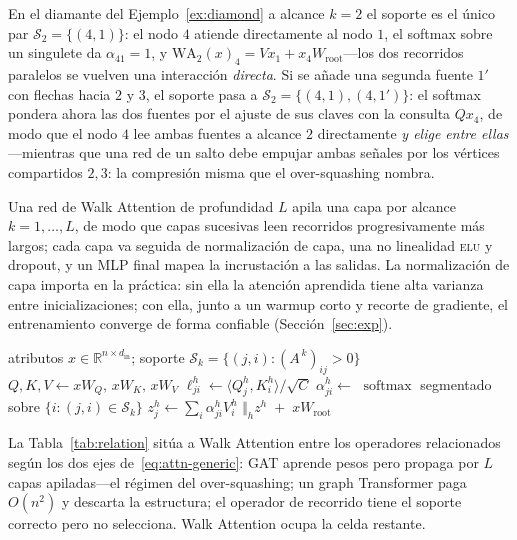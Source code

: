 \documentclass[runningheads]{llncs}
\newcommand{\RR}{\mathbb{R}}
\newcommand{\Adj}{A}
\DeclareMathOperator{\softmax}{softmax}
\begin{document}
\begin{example}\label{ex:layer}
En el diamante del Ejemplo~\ref{ex:diamond} a alcance $k=2$ el soporte es el
único par $\mathcal{S}_2=\{(4,1)\}$: el nodo $4$ atiende directamente al nodo
$1$, el softmax sobre un singulete da $\alpha_{41}=1$, y
$\mathrm{WA}_2(x)_4=Vx_1+x_4W_{\!\text{root}}$---los dos recorridos paralelos
se vuelven una interacción \emph{directa}. Si se añade una segunda fuente $1'$
con flechas hacia $2$ y $3$, el soporte pasa a
$\mathcal{S}_2=\{(4,1),(4,1')\}$: el softmax pondera ahora las dos fuentes por
el ajuste de sus claves con la consulta $Qx_4$, de modo que el nodo $4$ lee
ambas fuentes a alcance $2$ directamente \emph{y elige entre ellas}---mientras
que una red de un salto debe empujar ambas señales por los vértices compartidos
$2,3$: la compresión misma que el over-squashing nombra.
\end{example}

Una red de Walk Attention de profundidad $L$ apila una capa por alcance
$k=1,\dots,L$, de modo que capas sucesivas leen recorridos progresivamente más
largos; cada capa va seguida de normalización de capa, una no linealidad
\textsc{elu} y dropout, y un MLP final mapea la incrustación a las salidas. La
normalización de capa importa en la práctica: sin ella la atención aprendida
tiene alta varianza entre inicializaciones; con ella, junto a un warmup corto y
recorte de gradiente, el entrenamiento converge de forma confiable
(Sección~\ref{sec:exp}).

\begin{algorithm}[t]
\caption{Capa de Walk Attention a alcance $k$ (dispersa).}\label{alg:wa}
\begin{algorithmic}[1]
\Require atributos $x\in\RR^{n\times d_{\text{in}}}$; soporte
  $\mathcal{S}_k=\{(j,i):(\Adj^{\,k})_{ij}>0\}$
\State $Q,K,V \gets xW_Q,\,xW_K,\,xW_V$ 
  \State $\ell^h_{ji}\gets \langle Q^h_j,K^h_i\rangle/\sqrt{C}$
\EndFor
\State $\alpha^h_{ji}\gets$ $\softmax$ segmentado sobre $\{i:(j,i)\in\mathcal{S}_k\}$
\State $z^h_j\gets \sum_i \alpha^h_{ji}V^h_i$ 
\State \Return $\bigl\Vert_h z^h \;+\; xW_{\!\text{root}}$
\end{algorithmic}
\end{algorithm}

La Tabla~\ref{tab:relation} sitúa a Walk Attention entre los operadores
relacionados según los dos ejes de~\eqref{eq:attn-generic}: GAT aprende pesos
pero propaga por $L$ capas apiladas---el régimen del over-squashing; un graph
Transformer paga $O(n^2)$ y descarta la estructura; el operador de recorrido
tiene el soporte correcto pero no selecciona. Walk Attention ocupa la celda
restante.
\end{document}
